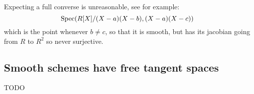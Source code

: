\begin{remark}
Expecting a full converse is unreasonable, see for example:
\[\operatorname{Spec}(R[X]/ (X-a)(X-b),(X-a)(X-c))\]
which is the point whenever $b\not=c$, so that it is smooth, but has its jacobian going from $R$ to $R^2$ so never surjective.
\end{remark}

\subsection{Smooth schemes have free tangent spaces}

TODO

